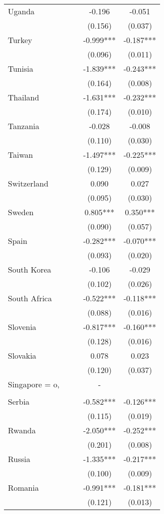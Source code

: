 \documentclass[]{article}
\begin{document}
\begin{tabular}{lcccc}
Uganda &  &  & -0.196 & -0.051 \\
 &  &  & (0.156) & (0.037) \\
Turkey &  &  & -0.999*** & -0.187*** \\
 &  &  & (0.096) & (0.011) \\
Tunisia &  &  & -1.839*** & -0.243*** \\
 &  &  & (0.164) & (0.008) \\
Thailand &  &  & -1.631*** & -0.232*** \\
 &  &  & (0.174) & (0.010) \\
Tanzania &  &  & -0.028 & -0.008 \\
 &  &  & (0.110) & (0.030) \\
Taiwan &  &  & -1.497*** & -0.225*** \\
 &  &  & (0.129) & (0.009) \\
Switzerland &  &  & 0.090 & 0.027 \\
 &  &  & (0.095) & (0.030) \\
Sweden &  &  & 0.805*** & 0.350*** \\
 &  &  & (0.090) & (0.057) \\
Spain &  &  & -0.282*** & -0.070*** \\
 &  &  & (0.093) & (0.020) \\
South Korea &  &  & -0.106 & -0.029 \\
 &  &  & (0.102) & (0.026) \\
South Africa &  &  & -0.522*** & -0.118*** \\
 &  &  & (0.088) & (0.016) \\
Slovenia &  &  & -0.817*** & -0.160*** \\
 &  &  & (0.128) & (0.016) \\
Slovakia &  &  & 0.078 & 0.023 \\
 &  &  & (0.120) & (0.037) \\
Singapore = o, &  &  & - &  \\
 &  &  &  &  \\
Serbia &  &  & -0.582*** & -0.126*** \\
 &  &  & (0.115) & (0.019) \\
Rwanda &  &  & -2.050*** & -0.252*** \\
 &  &  & (0.201) & (0.008) \\
Russia &  &  & -1.335*** & -0.217*** \\
 &  &  & (0.100) & (0.009) \\
Romania &  &  & -0.991*** & -0.181*** \\
 &  &  & (0.121) & (0.013) \\

\end{tabular}
\end{document}
